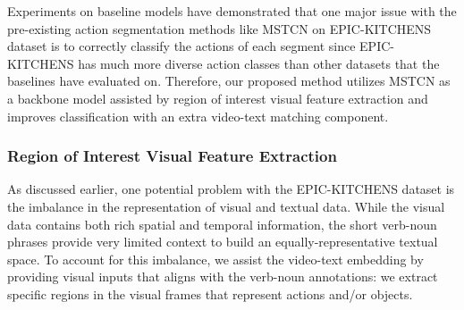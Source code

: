 





Experiments on baseline models have demonstrated that one major issue with the pre-existing action segmentation methods like MSTCN on EPIC-KITCHENS dataset is to correctly classify the actions of each segment since EPIC-KITCHENS has much more diverse action classes than other datasets \cite{5995444, 10.1145/2493432.2493482, 6909500} that the baselines have evaluated on. Therefore, our proposed method utilizes MSTCN as a backbone model assisted by region of interest visual feature extraction and improves classification with an extra video-text matching component.

\subsubsection{Region of Interest Visual Feature Extraction}
As discussed earlier, one potential problem with the EPIC-KITCHENS dataset is the imbalance in the representation of visual and textual data. While the visual data contains both rich spatial and temporal information, the short verb-noun phrases provide very limited context to build an equally-representative textual space. To account for this imbalance, we assist the video-text embedding by providing visual inputs that aligns with the verb-noun annotations: we extract specific regions in the visual frames that represent actions and/or objects. 

